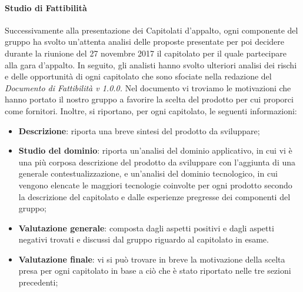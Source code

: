 \paragraph{Studio di Fattibilità}\Spazio
Successivamente alla presentazione dei Capitolati d'appalto, ogni componente del gruppo ha svolto un'attenta analisi delle proposte presentate per poi decidere durante la riunione del 27 novembre 2017 il capitolato per il quale partecipare alla gara d'appalto. In seguito, gli analisti hanno svolto ulteriori analisi dei rischi e delle opportunità di ogni capitolato che sono sfociate nella redazione del \emph{Documento di Fattibilità v 1.0.0.} Nel documento vi troviamo le motivazioni che hanno portato il nostro gruppo a favorire la scelta del prodotto per cui proporci come fornitori. Inoltre, si riportano, per ogni capitolato, le seguenti informazioni:
\begin{itemize}
 	\item\textbf{{Descrizione}}: riporta una breve sintesi del prodotto da sviluppare;
 	\item\textbf{{Studio del dominio}}: riporta un'analisi del dominio applicativo, in cui vi è una più corposa descrizione del prodotto da sviluppare con l'aggiunta di una generale contestualizzazione, e un'analisi del dominio tecnologico, in cui vengono elencate le maggiori tecnologie coinvolte per ogni prodotto secondo la descrizione del capitolato e dalle esperienze pregresse dei componenti del gruppo;
 	\item\textbf{{Valutazione generale}}: composta dagli aspetti positivi e dagli aspetti negativi trovati e discussi dal gruppo riguardo al capitolato in esame.
 	\item\textbf{{Valutazione finale}}: vi si può trovare in breve la motivazione della scelta presa per ogni capitolato in base a ciò che è stato riportato nelle tre sezioni precedenti;
\end{itemize}
\pagebreak
